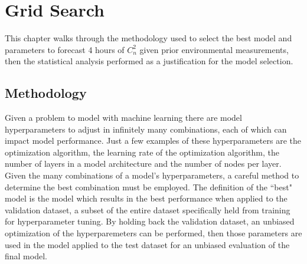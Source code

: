 \chapter{Grid Search}
\label{ch4}
This chapter walks through the methodology used to select the best model and parameters to forecast 4 hours of $C_{n}^{2}$ given prior environmental measurements, then the statistical analysis performed as a justification for the model selection.

\section{Methodology}
Given a problem to model with machine learning there are model hyperparameters to adjust in infinitely many combinations, each of which can impact model performance. Just a few examples of these hyperparameters are the optimization algorithm, the learning rate of the optimization algorithm, the number of layers in a model architecture and the number of nodes per layer. Given the many combinations of a model's hyperparameters, a careful method to determine the best combination must be employed. The definition of the ``best" model is the model which results in the best performance when applied to the validation dataset, a subset of the entire dataset specifically held from training for hyperparameter tuning. By holding back the validation dataset, an unbiased optimization of the hyperparemeters can be performed, then those parameters are used in the model applied to the test dataset for an unbiased evaluation of the final model.

